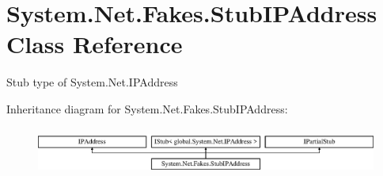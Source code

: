 \hypertarget{class_system_1_1_net_1_1_fakes_1_1_stub_i_p_address}{\section{System.\-Net.\-Fakes.\-Stub\-I\-P\-Address Class Reference}
\label{class_system_1_1_net_1_1_fakes_1_1_stub_i_p_address}
}


Stub type of System.\-Net.\-I\-P\-Address 


Inheritance diagram for System.\-Net.\-Fakes.\-Stub\-I\-P\-Address\-:\begin{figure}[H]
\begin{center}
\leavevmode
\includegraphics[height=1.588652cm]{class_system_1_1_net_1_1_fakes_1_1_stub_i_p_address}
\end{center}
\end{figure}
